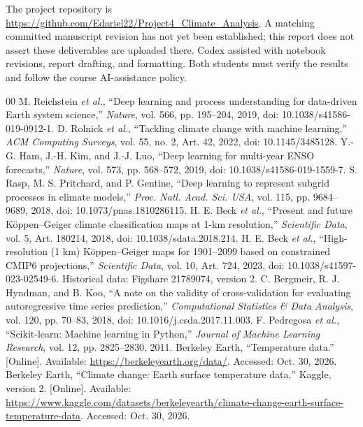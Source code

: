\documentclass[conference]{IEEEtran}
\begin{document}
The project repository is \url{https://github.com/Edariel22/Project4_Climate_Analysis}. A matching committed manuscript revision has not yet been established; this report does not assert these deliverables are uploaded there. Codex assisted with notebook revisions, report drafting, and formatting. Both students must verify the results and follow the course AI-assistance policy.

\begin{thebibliography}{00}
 M. Reichstein \emph{et al.}, ``Deep learning and process understanding for data-driven Earth system science,'' \emph{Nature}, vol. 566, pp. 195--204, 2019, doi: 10.1038/s41586-019-0912-1.
 D. Rolnick \emph{et al.}, ``Tackling climate change with machine learning,'' \emph{ACM Computing Surveys}, vol. 55, no. 2, Art. 42, 2022, doi: 10.1145/3485128.
 Y.-G. Ham, J.-H. Kim, and J.-J. Luo, ``Deep learning for multi-year ENSO forecasts,'' \emph{Nature}, vol. 573, pp. 568--572, 2019, doi: 10.1038/s41586-019-1559-7.
 S. Rasp, M. S. Pritchard, and P. Gentine, ``Deep learning to represent subgrid processes in climate models,'' \emph{Proc. Natl. Acad. Sci. USA}, vol. 115, pp. 9684--9689, 2018, doi: 10.1073/pnas.1810286115.
 H. E. Beck \emph{et al.}, ``Present and future K\"oppen--Geiger climate classification maps at 1-km resolution,'' \emph{Scientific Data}, vol. 5, Art. 180214, 2018, doi: 10.1038/sdata.2018.214.
 H. E. Beck \emph{et al.}, ``High-resolution (1 km) K\"oppen--Geiger maps for 1901--2099 based on constrained CMIP6 projections,'' \emph{Scientific Data}, vol. 10, Art. 724, 2023, doi: 10.1038/s41597-023-02549-6. Historical data: Figshare 21789074, version 2.
 C. Bergmeir, R. J. Hyndman, and B. Koo, ``A note on the validity of cross-validation for evaluating autoregressive time series prediction,'' \emph{Computational Statistics \& Data Analysis}, vol. 120, pp. 70--83, 2018, doi: 10.1016/j.csda.2017.11.003.
 F. Pedregosa \emph{et al.}, ``Scikit-learn: Machine learning in Python,'' \emph{Journal of Machine Learning Research}, vol. 12, pp. 2825--2830, 2011.
 Berkeley Earth, ``Temperature data.'' [Online]. Available: \url{https://berkeleyearth.org/data/}. Accessed: Oct. 30, 2026.
 Berkeley Earth, ``Climate change: Earth surface temperature data,'' Kaggle, version 2. [Online]. Available: \url{https://www.kaggle.com/datasets/berkeleyearth/climate-change-earth-surface-temperature-data}. Accessed: Oct. 30, 2026.

\end{thebibliography}
\end{document}
